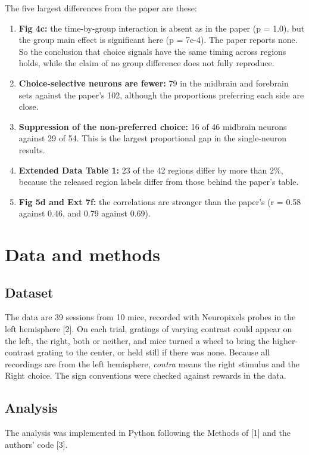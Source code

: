 \documentclass[11pt,a4paper]{article}
\begin{document}
The five largest differences from the paper are these:
\begin{enumerate}[itemsep=2pt]
\item \textbf{Fig 4c:} the time-by-group interaction is absent as in the paper (p = 1.0), but the group main effect is significant here (p = 7e-4). The paper reports none. So the conclusion that choice signals have the same timing across regions holds, while the claim of no group difference does not fully reproduce.
\item \textbf{Choice-selective neurons are fewer:} 79 in the midbrain and forebrain sets against the paper's 102, although the proportions preferring each side are close.
\item \textbf{Suppression of the non-preferred choice:} 16 of 46 midbrain neurons against 29 of 54. This is the largest proportional gap in the single-neuron results.
\item \textbf{Extended Data Table 1:} 23 of the 42 regions differ by more than 2\%, because the released region labels differ from those behind the paper's table.
\item \textbf{Fig 5d and Ext 7f:} the correlations are stronger than the paper's (r = 0.58 against 0.46, and 0.79 against 0.69).
\end{enumerate}

\section{Data and methods}

\subsection{Dataset}
The data are 39 sessions from 10 mice, recorded with Neuropixels probes in the left hemisphere [2]. On each trial, gratings of varying contrast could appear on the left, the right, both or neither, and mice turned a wheel to bring the higher-contrast grating to the center, or held still if there was none. Because all recordings are from the left hemisphere, \emph{contra} means the right stimulus and the Right choice. The sign conventions were checked against rewards in the data.

\subsection{Analysis}
The analysis was implemented in Python following the Methods of [1] and the authors' code [3].
\end{document}
